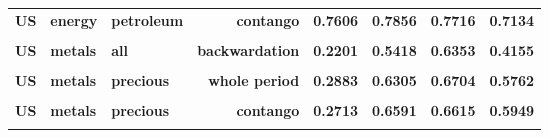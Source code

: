 \documentclass[
  authoryear,
  preprint,
  3p]{elsarticle}
\begin{document}
\begin{longtable}[t]{>{}l>{}l>{}l>{}r>{}r>{}r>{}r>{}r}
\textbf{US} & \textbf{energy} & \textbf{petroleum} & \textbf{contango} & \textcolor[HTML]{4285f4}{\textbf{0.7606}} & \textcolor[HTML]{4285f4}{\textbf{0.7856}} & \textcolor[HTML]{4285f4}{\textbf{0.7716}} & \textcolor[HTML]{4285f4}{\textbf{0.7134}}\\
\textbf{\cellcolor{gray!10}{US}} & \textbf{\cellcolor{gray!10}{metals}} & \textbf{\cellcolor{gray!10}{all}} & \textbf{\cellcolor{gray!10}{whole period}} & \textcolor[HTML]{4285f4}{\textbf{\cellcolor{gray!10}{0.2167}}} & \textcolor[HTML]{4285f4}{\textbf{\cellcolor{gray!10}{0.5553}}} & \textcolor[HTML]{4285f4}{\textbf{\cellcolor{gray!10}{0.5877}}} & \textcolor[HTML]{4285f4}{\textbf{\cellcolor{gray!10}{0.4721}}}\\
\addlinespace
\textbf{US} & \textbf{metals} & \textbf{all} & \textbf{backwardation} & \textcolor[HTML]{4285f4}{\textbf{0.2201}} & \textcolor[HTML]{4285f4}{\textbf{0.5418}} & \textcolor[HTML]{4285f4}{\textbf{0.6353}} & \textcolor[HTML]{4285f4}{\textbf{0.4155}}\\
\textbf{\cellcolor{gray!10}{US}} & \textbf{\cellcolor{gray!10}{metals}} & \textbf{\cellcolor{gray!10}{all}} & \textbf{\cellcolor{gray!10}{contango}} & \textcolor[HTML]{4285f4}{\textbf{\cellcolor{gray!10}{0.2145}}} & \textcolor[HTML]{4285f4}{\textbf{\cellcolor{gray!10}{0.5727}}} & \textcolor[HTML]{4285f4}{\textbf{\cellcolor{gray!10}{0.5709}}} & \textcolor[HTML]{4285f4}{\textbf{\cellcolor{gray!10}{0.5035}}}\\
\textbf{US} & \textbf{metals} & \textbf{precious} & \textbf{whole period} & \textcolor[HTML]{4285f4}{\textbf{0.2883}} & \textcolor[HTML]{4285f4}{\textbf{0.6305}} & \textcolor[HTML]{4285f4}{\textbf{0.6704}} & \textcolor[HTML]{4285f4}{\textbf{0.5762}}\\
\textbf{\cellcolor{gray!10}{US}} & \textbf{\cellcolor{gray!10}{metals}} & \textbf{\cellcolor{gray!10}{precious}} & \textbf{\cellcolor{gray!10}{backwardation}} & \textcolor[HTML]{4285f4}{\textbf{\cellcolor{gray!10}{0.3070}}} & \textcolor[HTML]{4285f4}{\textbf{\cellcolor{gray!10}{0.6061}}} & \textcolor[HTML]{4285f4}{\textbf{\cellcolor{gray!10}{0.6991}}} & \textcolor[HTML]{4285f4}{\textbf{\cellcolor{gray!10}{0.5386}}}\\
\textbf{US} & \textbf{metals} & \textbf{precious} & \textbf{contango} & \textcolor[HTML]{4285f4}{\textbf{0.2713}} & \textcolor[HTML]{4285f4}{\textbf{0.6591}} & \textcolor[HTML]{4285f4}{\textbf{0.6615}} & \textcolor[HTML]{4285f4}{\textbf{0.5949}}\\
\addlinespace
\textbf{\cellcolor{gray!10}{GB}} & \textbf{\cellcolor{gray!10}{all}} & \textbf{\cellcolor{gray!10}{all}} & \textbf{\cellcolor{gray!10}{whole period}} & \textcolor[HTML]{4285f4}{\textbf{\cellcolor{gray!10}{0.4047}}} & \textcolor[HTML]{4285f4}{\textbf{\cellcolor{gray!10}{0.4691}}} & \textcolor[HTML]{4285f4}{\textbf{\cellcolor{gray!10}{0.6536}}} & \textcolor[HTML]{4285f4}{\textbf{\cellcolor{gray!10}{0.4412}}}\\

\end{longtable}
\end{document}

